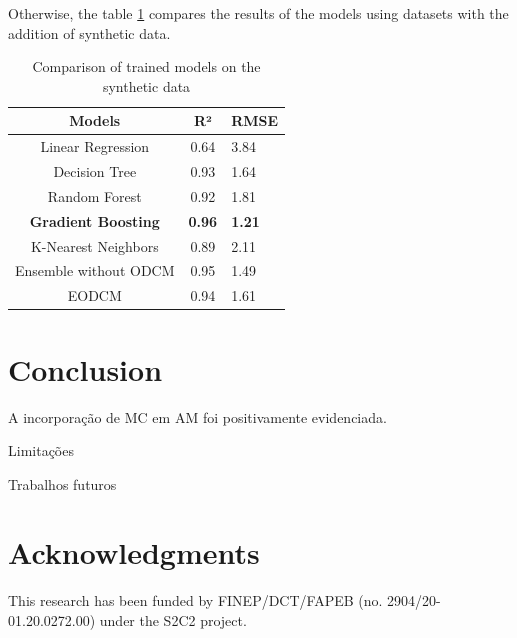 \documentclass[
]{ceurart}
\begin{document}
Otherwise, the table \ref{tab:comparison-synthetic} compares the results of the models using datasets with the addition of synthetic data.

\begin{table}[ht]
  \caption{Comparison of trained models on the synthetic data}
  \label{tab:comparison-synthetic}
  \begin{tabular}{ccl}
    \toprule
    Models & R² & RMSE \\
    \midrule
    Linear Regression & 0.64 & 3.84\\
    Decision Tree & 0.93 & 1.64\\
    Random Forest & 0.92 & 1.81\\
    \textbf{Gradient Boosting} & \textbf{0.96} & \textbf{1.21}\\
    K-Nearest Neighbors & 0.89 & 2.11\\
    Ensemble without ODCM & 0.95 & 1.49\\
    EODCM & 0.94 & 1.61\\
  \bottomrule
\end{tabular}
\end{table}

\section{Conclusion}

A incorporação de MC em AM foi positivamente evidenciada.

Limitações

\par Trabalhos futuros


\section{Acknowledgments}

This research has been funded by FINEP/DCT/FAPEB (no. 2904/20-01.20.0272.00) under the S2C2 project.



\end{document}
